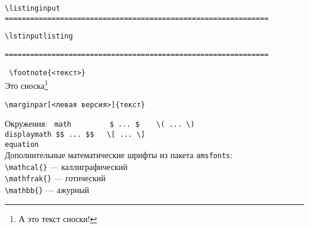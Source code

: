 \noindent
\texttt{\textbackslash listinginput}
\texttt{==============================================================}

\noindent
\texttt{\textbackslash lstinputlisting}

\texttt{==============================================================}

\clearpage

\noindent
\texttt{
\textbackslash footnote\{<текст>\}}\\
Это сноска\footnote{А это текст сноски!}

\begin{verbatim}
\marginpar[<левая версия>]{текст}
\end{verbatim}


\clearpage

\noindent
Окружения:
\texttt{
math \ \ \ \ \ \ \ \ \$ ... \$ \ \ \  \textbackslash( ... \textbackslash) \\
displaymath \$\$ ... \$\$ \ \ \textbackslash[ ... \textbackslash ] \\
equation}
\\
Дополнительные математические шрифты из пакета \texttt{amsfonts}:\\
\texttt{\textbackslash mathcal\{\}} --- каллиграфический\\
\texttt{\textbackslash mathfrak\{\}} --- готический\\
\texttt{\textbackslash mathbb\{\}} --- ажурный


